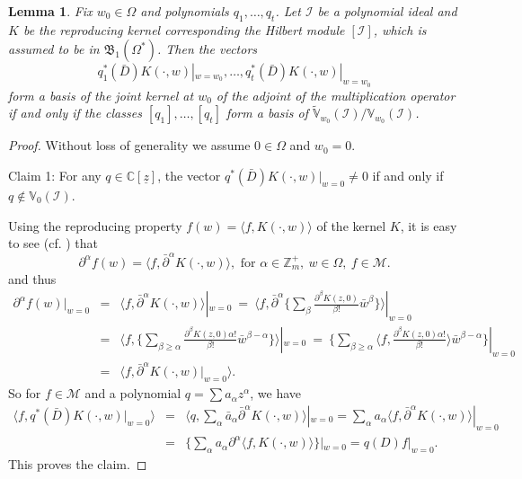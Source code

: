 \documentclass[11pt]{amsart}
\newtheorem{lem}[thm]{Lemma}
\theoremstyle{definition}
\numberwithin{equation}{section}
\begin{document}
\begin{lem}\label{nice}
Fix $w_0\in\Omega$ and polynomials $q_1,\ldots,q_t$. Let $\mathcal I$ be a polynomial ideal and $K$ be the reproducing kernel corresponding the Hilbert module $[\mathcal I]$, which is assumed to be in $\mathfrak B_1(\Omega^*)$. Then the vectors 
$$
q^*_1(\bar D)K(\cdot, w)|_{w=w_0},\ldots, q^*_t(\bar D)K(\cdot, w)|_{w=w_0}
$$ 
form a basis of the joint kernel at $w_0$ of the adjoint of the multiplication operator
if and only if the classes $[q_1],\ldots,[q_t]$ form a basis of $\tilde{\mathbb V}_{w_0}(\mathcal I)/\mathbb V_{w_0}(\mathcal I)$.
\end{lem}
\begin{proof} Without loss of generality we assume $0\in\Omega$ and $w_0=0$.

\textsf{Claim 1}: For any $q\in {{\mathbb C}}[\underline z]$, the vector $q^*(\bar D)K(\cdot,w)|_{w=0}\neq 0$ if and only if
$q\notin\mathbb V_0(\mathcal I)$.

Using the reproducing property $f(w) = \langle f, K(\cdot,w)\rangle$  of the kernel $K$,
it is easy to see (cf. \cite{cs}) that
$$\partial^{\alpha}f(w) = \langle f,
\bar\partial^{\alpha} K(\cdot,w)\rangle, \mbox{~for~}  \alpha\in\mathbb Z_m^+, ~w\in\Omega,
 ~f\in\mathcal M.
$$
and thus
\begin{eqnarray*}
\partial^{\alpha}f(w)|_{w=0}&=&\langle f, \bar\partial^{\alpha}
K(\cdot,w)\rangle|_{w=0}~=~\langle f, \bar\partial^{\alpha} \{{\sum}_{\beta}
\frac{{\partial}^{\beta}K(z,0)}{{\beta}!}{\bar w}^{\beta}\}\rangle|_{w=0}\\ &=& \langle f,
\{{\sum}_{\beta\geq\alpha} \frac{{\partial}^{\beta}K(z,0){\alpha}!}{{\beta}!}{\bar
w}^{\beta-\alpha}\}\rangle|_{w=0}~=~\{{\sum}_{\beta\geq\alpha} \langle f,
\frac{{\partial}^{\beta}K(z,0){\alpha}!}{{\beta}!}\rangle{\bar w}^{\beta-\alpha}\}|_{w=0}\\ &=& \langle f,
\bar\partial^{\alpha} K(\cdot,w)|_{w=0}\rangle.
\end{eqnarray*}
So for $f\in\mathcal M$ and a polynomial $q={\sum} a_{\alpha}z^{\alpha}$, we have
\begin{eqnarray}\label{gendiff}
\langle f, q^*(\bar D)K(\cdot, w)|_{w=0}\rangle &=& \langle q,
{\sum}_{\alpha} {\bar a}_{\alpha}\bar\partial^{\alpha}K(\cdot, w)\rangle|_{w=0}= {\sum}_{\alpha}  a_{\alpha}\langle f,
\bar\partial^{\alpha}K(\cdot, w)\rangle|_{w=0}  \\
&=& \{{\sum}_{\alpha}  a_{\alpha}\partial^{\alpha}\langle f,
K(\cdot, w)\rangle\}|_{w=0} =q(D)f|_{w=0}.\nonumber
\end{eqnarray}
This proves the claim.


\end{proof}
\end{document}

